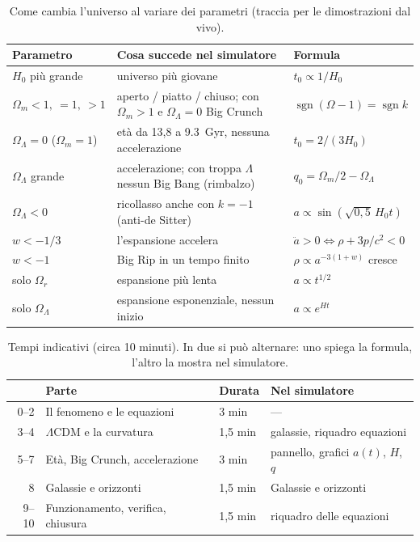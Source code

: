 \documentclass[11pt,a4paper]{article}
\newcommand{\Om}{\Omega_m}
\newcommand{\Or}{\Omega_r}
\newcommand{\OL}{\Omega_\Lambda}
\begin{document}
\begin{table}[H]\centering\small
\begin{tabularx}{\linewidth}{@{}l>{\raggedright\arraybackslash}Xl@{}}
\toprule
Parametro & Cosa succede nel simulatore & Formula\\
\midrule
$H_0$ più grande & universo più giovane & $t_0\propto 1/H_0$\\
$\Om<1,\ =1,\ >1$ & aperto / piatto / chiuso; con $\Om>1$ e $\OL=0$ Big Crunch & $\operatorname{sgn}(\Omega-1)=\operatorname{sgn}k$\\
$\OL=0$ ($\Om=1$) & età da 13,8 a \SI{9.3}{Gyr}, nessuna accelerazione & $t_0=2/(3H_0)$\\
$\OL$ grande & accelerazione; con troppa $\Lambda$ nessun Big Bang (rimbalzo) & $q_0=\Om/2-\OL$\\
$\OL<0$ & ricollasso anche con $k=-1$ (anti-de Sitter) & $a\propto\sin(\sqrt{0{,}5}\,H_0t)$\\
$w<-1/3$ & l'espansione accelera & $\ddot a>0\iff\rho+3p/c^2<0$\\
$w<-1$ & Big Rip in un tempo finito & $\rho\propto a^{-3(1+w)}$ cresce\\
solo $\Or$ & espansione più lenta & $a\propto t^{1/2}$\\
solo $\OL$ & espansione esponenziale, nessun inizio & $a\propto e^{Ht}$\\
\bottomrule
\end{tabularx}
\caption{Come cambia l'universo al variare dei parametri (traccia per le dimostrazioni dal vivo).}
\end{table}

\begin{table}[H]\centering\small
\begin{tabular}{@{}rlll@{}}
\toprule
& Parte & Durata & Nel simulatore\\
\midrule
0--2 & Il fenomeno e le equazioni & 3 min & ---\\
3--4 & $\Lambda$CDM e la curvatura & 1,5 min & galassie, riquadro equazioni\\
5--7 & Età, Big Crunch, accelerazione & 3 min & pannello, grafici $a(t)$, $H$, $q$\\
8 & Galassie e orizzonti & 1,5 min & Galassie e orizzonti\\
9--10 & Funzionamento, verifica, chiusura & 1,5 min & riquadro delle equazioni\\
\bottomrule
\end{tabular}
\caption{Tempi indicativi (circa 10 minuti). In due si può alternare: uno spiega la formula, l'altro la mostra nel simulatore.}
\end{table}
\end{document}
